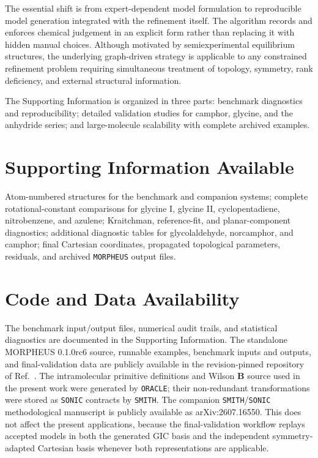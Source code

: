 \documentclass[aip,jcp,reprint,longbibliography,floatfix]{revtex4-2}
\begin{document}
The essential shift is from expert-dependent model formulation to reproducible
model generation integrated with the refinement itself. The
algorithm records and enforces chemical judgement in an explicit form rather
than replacing it with hidden manual choices. Although motivated by
semiexperimental equilibrium structures, the underlying graph-driven strategy
is applicable to any constrained refinement problem requiring simultaneous
treatment of topology, symmetry, rank deficiency, and external structural
information.

The Supporting Information is organized in three parts: benchmark diagnostics
and reproducibility; detailed validation studies for camphor, glycine, and the
anhydride series; and large-molecule scalability with complete archived
examples.

\section*{Supporting Information Available}

Atom-numbered structures for the benchmark and companion systems; complete
rotational-constant comparisons for glycine I, glycine II, cyclopentadiene,
nitrobenzene, and azulene; Kraitchman, reference-fit, and planar-component
diagnostics; additional diagnostic tables for glycolaldehyde, norcamphor, and
camphor; final Cartesian coordinates, propagated topological parameters,
residuals, and archived \texttt{MORPHEUS} output files.

\section*{Code and Data Availability}

The benchmark input/output files, numerical audit trails, and statistical
diagnostics are documented in the Supporting Information. The standalone
MORPHEUS 0.1.0rc6 source, runnable examples, benchmark inputs and outputs, and
final-validation data are publicly available in the revision-pinned repository
of Ref.~. The intramolecular primitive
definitions and Wilson $\mathbf{B}$ source used in the present work were
generated by \texttt{ORACLE}; their non-redundant transformations were stored
as \texttt{SONIC} contracts by \texttt{SMITH}. The companion
\texttt{SMITH}/\texttt{SONIC} methodological manuscript is publicly available
as arXiv:2607.16550.\cite{Barone2026SONIC} This does not affect the present
applications, because the final-validation workflow replays accepted models in
both the generated GIC basis and the independent symmetry-adapted Cartesian
basis whenever both representations are applicable.




\end{document}
